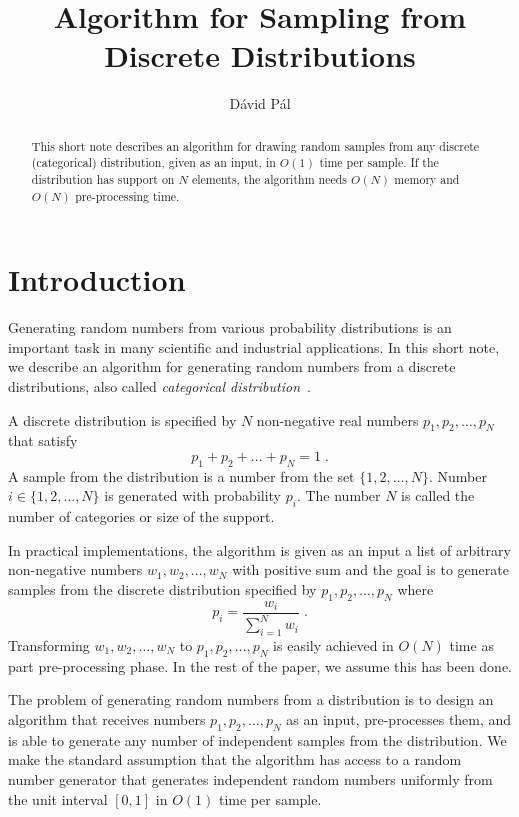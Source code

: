 \documentclass{article}
\title{Algorithm for Sampling from Discrete Distributions}
\author{D\'avid P\'al}
\begin{document}
\maketitle

\begin{abstract}
This short note describes an algorithm for drawing random samples from any
discrete (categorical) distribution, given as an input, in $O(1)$ time per
sample.  If the distribution has support on $N$ elements, the algorithm needs
$O(N)$ memory and $O(N)$ pre-processing time.
\end{abstract}

\section{Introduction}
\label{section:introduction}

Generating random numbers from various probability distributions is an
important task in many scientific and industrial applications. In this short
note, we describe an algorithm for generating random numbers from a discrete
distributions, also called \emph{categorical distribution}~\cite{wikipedia}.

A discrete distribution is specified by $N$ non-negative real numbers
$p_1, p_2, \dots, p_N$ that satisfy
$$
p_1 + p_2 + \dots + p_N = 1 \; .
$$
A sample from the distribution is a number from the set $\{1,2,\dots,N\}$.
Number $i \in \{1,2,\dots,N\}$ is generated with probability $p_i$.  The number
$N$ is called the number of categories or size of the support.

In practical implementations, the algorithm is given as an input
a list of arbitrary non-negative numbers $w_1, w_2, \dots, w_N$
with positive sum and the goal is to generate samples from the discrete
distribution specified by $p_1, p_2, \dots, p_N$ where
$$
p_i = \frac{w_i}{\sum_{i=1}^N w_i} \; .
$$
Transforming $w_1, w_2, \dots, w_N$ to $p_1, p_2, \dots, p_N$ is easily
achieved in $O(N)$ time as part pre-processing phase.  In the rest of the
paper, we assume this has been done.

The problem of generating random numbers from a distribution is to design an
algorithm that receives numbers $p_1, p_2, \dots, p_N$ as an input,
pre-processes them, and is able to generate any number of independent samples
from the distribution. We make the standard assumption that the algorithm has
access to a random number generator that generates independent random numbers
uniformly from the unit interval $[0,1]$ in $O(1)$ time per sample.
\end{document}
